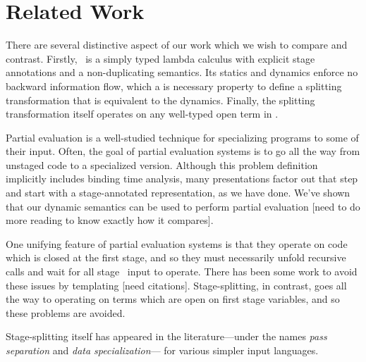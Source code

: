 
\section{Related Work}


There are several distinctive aspect of our work which we wish to compare and contrast.
Firstly, \lang\ is a simply typed lambda calculus 
with explicit stage annotations and a non-duplicating semantics.
Its statics and dynamics enforce no backward information flow,
which a is necessary property to define a splitting transformation
that is equivalent to the dynamics.
Finally, the splitting transformation itself operates on any well-typed open term in \lang.

Partial evaluation is a well-studied technique for specializing programs to some of their input.  
Often, the goal of partial evaluation systems is to go all the way from unstaged code to a specialized version.
Although this problem definition implicitly includes binding time analysis,
many presentations factor out that step and start with a stage-annotated representation, as we have done.
We've shown that our dynamic semantics can be used to perform partial evaluation 
[need to do more reading to know exactly how it compares].

One unifying feature of partial evaluation systems is that they operate on code which is closed at the first stage,
and so they must necessarily unfold recursive calls and wait for all stage \bbone\ input to operate.
There has been some work to avoid these issues by templating [need citations].
Stage-splitting, in contrast, goes all the way to operating on terms which are open on first stage variables,
and so these problems are avoided.


Stage-splitting itself has appeared in the literature---under 
the names {\em pass separation} and {\em data specialization}--- for various simpler input languages.

